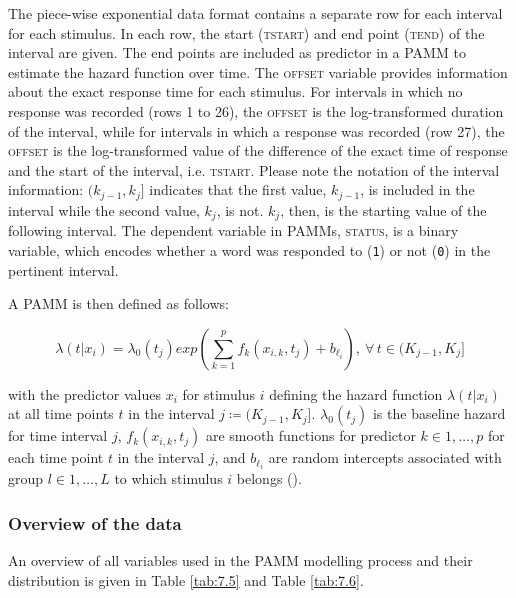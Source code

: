 The piece-wise exponential data format contains a separate row for each interval for each stimulus. In each row, the start (\textsc{tstart}) and end point (\textsc{tend}) of the interval are given. The end points are included as predictor in a PAMM to estimate the hazard function over time. The \textsc{offset} variable provides information about the exact response time for each stimulus. For intervals in which no response was recorded (rows 1 to 26), the \textsc{offset} is the log-transformed duration of the interval, while for intervals in which a response was recorded (row 27), the \textsc{offset} is the log-transformed value of the difference of the exact time of response and the start of the interval, i.e. \textsc{tstart}. Please note the notation of the interval information: $(k_{j-1},k_j]$ indicates that the first value, $k_{j-1}$, is included in the interval while the second value, $k_j$, is not. $k_j$, then, is the starting value of the following interval. The dependent variable in PAMMs, \textsc{status}, is a binary variable, which encodes whether a word was responded to (\texttt{1}) or not (\texttt{0}) in the pertinent interval. 

A PAMM is then defined as follows:

\begin{equation}
\label{eq:lambdatxi}
\lambda(t|x_{i})=\lambda_{0}(t_{j})exp\left ( \sum_{k=1}^{p}f_{k}(x_{i,k},t_{j})+b_{\ell_{i}} \right ),\: \forall\, t \in (K_{j-1},K_{j}]
\end{equation}

\noindent with the predictor values $x_i$ for stimulus $i$ defining the hazard function $\lambda(t|x_{i})$ at all time points $t$ in the interval $j≔(K_{j-1},K_j]$. $λ_0 (t_j)$ is the baseline hazard for time interval $j$, $f_k (x_{i,k},t_j)$ are smooth functions for predictor $k∈1,…,p$ for each time point $t$ in the interval $j$, and $b_{\ell_{i}}$ are random intercepts associated with group $l∈1,…,L$ to which stimulus $i$ belongs (\cite{Hendrix2020}).

\subsubsection{Overview of the data}\label{section07_2_2_1}

An overview of all variables used in the PAMM modelling process and their distribution is given in Table \ref{tab:7.5} and Table \ref{tab:7.6}.

